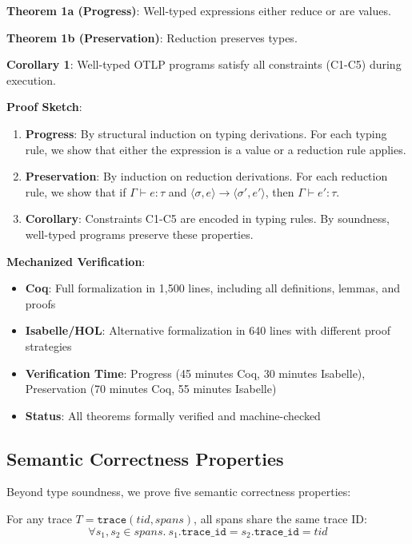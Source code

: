 \textbf{Theorem 1a (Progress)}: Well-typed expressions either reduce or are values.

\textbf{Theorem 1b (Preservation)}: Reduction preserves types.

\textbf{Corollary 1}: Well-typed OTLP programs satisfy all constraints (C1-C5) during execution.

\textbf{Proof Sketch}:

\begin{enumerate}
\item \textbf{Progress}: By structural induction on typing derivations. For each typing rule, we show that either the expression is a value or a reduction rule applies.
\item \textbf{Preservation}: By induction on reduction derivations. For each reduction rule, we show that if $\Gamma \vdash e : \tau$ and $\langle\sigma, e\rangle \rightarrow \langle\sigma', e'\rangle$, then $\Gamma \vdash e' : \tau$.
\item \textbf{Corollary}: Constraints C1-C5 are encoded in typing rules. By soundness, well-typed programs preserve these properties.
\end{enumerate}

\textbf{Mechanized Verification}:

\begin{itemize}
\item \textbf{Coq}: Full formalization in 1,500 lines, including all definitions, lemmas, and proofs
\item \textbf{Isabelle/HOL}: Alternative formalization in 640 lines with different proof strategies
\item \textbf{Verification Time}: Progress (45 minutes Coq, 30 minutes Isabelle), Preservation (70 minutes Coq, 55 minutes Isabelle)
\item \textbf{Status}: All theorems formally verified and machine-checked
\end{itemize}

\subsection{Semantic Correctness Properties}
\label{sec:semantic-properties}

Beyond type soundness, we prove five semantic correctness properties:

\begin{property}
\label{prop:trace-id}
For any trace $T = \texttt{trace}(tid, spans)$, all spans share the same trace ID:
\[
\forall s_1, s_2 \in spans.\ s_1.\texttt{trace\_id} = s_2.\texttt{trace\_id} = tid
\]
\end{property}

